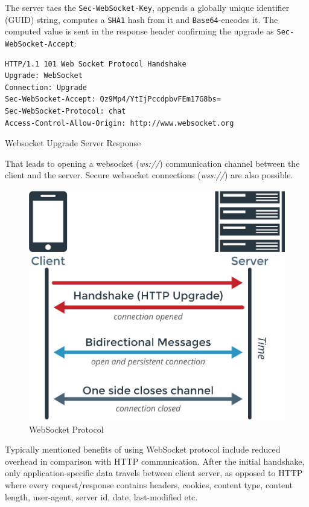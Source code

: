 \documentclass{uvamscse}
\begin{document}
The server taes the \texttt{Sec-WebSocket-Key}, appends a globally unique identifier (GUID) string, computes a \texttt{SHA1} hash from it and \texttt{Base64}-encodes it. The computed value is sent in the response header confirming the upgrade as \texttt{Sec-WebSocket-Accept}:

\begin{sourcecode}
\begin{lstlisting}[style=mono]
HTTP/1.1 101 Web Socket Protocol Handshake
Upgrade: WebSocket
Connection: Upgrade
Sec-WebSocket-Accept: Qz9Mp4/YtIjPccdpbvFEm17G8bs=
Sec-WebSocket-Protocol: chat
Access-Control-Allow-Origin: http://www.websocket.org
\end{lstlisting}
\caption{Websocket Upgrade Server Response}
\end{sourcecode}

That leads to opening a websocket (\textit{ws://}) communication channel between the client and the server. Secure websocket connections (\textit{wss://}) are also possible.

\begin{figure}[h]
\centering
\includegraphics[scale=0.3]{ws}
\caption{WebSocket Protocol}
\end{figure}

Typically mentioned benefits of using WebSocket protocol include reduced overhead in comparison with HTTP communication. After the initial handshake, only application-specific data travels between client server, as opposed to HTTP where every request/response contains headers, cookies, content type, content length, user-agent, server id, date, last-modified etc.
\end{document}
